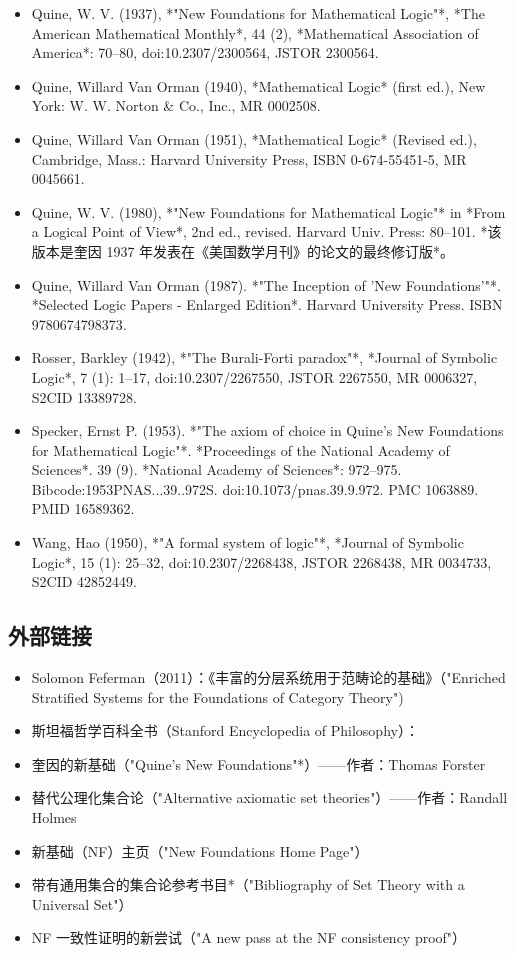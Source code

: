 \begin{itemize}
\item Quine, W. V. (1937), *"New Foundations for Mathematical Logic"*, *The American Mathematical Monthly*, 44 (2), *Mathematical Association of America*: 70–80, doi:10.2307/2300564, JSTOR 2300564.  
\item Quine, Willard Van Orman (1940), *Mathematical Logic* (first ed.), New York: W. W. Norton & Co., Inc., MR 0002508.  
\item Quine, Willard Van Orman (1951), *Mathematical Logic* (Revised ed.), Cambridge, Mass.: Harvard University Press, ISBN 0-674-55451-5, MR 0045661.  
\item Quine, W. V. (1980), *"New Foundations for Mathematical Logic"* in *From a Logical Point of View*, 2nd ed., revised. Harvard Univ. Press: 80–101. *该版本是奎因 1937 年发表在《美国数学月刊》的论文的最终修订版*。  
\item Quine, Willard Van Orman (1987). *"The Inception of 'New Foundations'"*. *Selected Logic Papers - Enlarged Edition*. Harvard University Press. ISBN 9780674798373.  
\item Rosser, Barkley (1942), *"The Burali-Forti paradox"*, *Journal of Symbolic Logic*, 7 (1): 1–17, doi:10.2307/2267550, JSTOR 2267550, MR 0006327, S2CID 13389728.  
\item Specker, Ernst P. (1953). *"The axiom of choice in Quine's New Foundations for Mathematical Logic"*. *Proceedings of the National Academy of Sciences*. 39 (9). *National Academy of Sciences*: 972–975. Bibcode:1953PNAS...39..972S. doi:10.1073/pnas.39.9.972. PMC 1063889. PMID 16589362.  
\item Wang, Hao (1950), *"A formal system of logic"*, *Journal of Symbolic Logic*, 15 (1): 25–32, doi:10.2307/2268438, JSTOR 2268438, MR 0034733, S2CID 42852449.
\end{itemize}
\subsection{外部链接}  
\begin{itemize}
\item Solomon Feferman（2011）：《丰富的分层系统用于范畴论的基础》（"Enriched Stratified Systems for the Foundations of Category Theory")  
\item 斯坦福哲学百科全书（Stanford Encyclopedia of Philosophy）：  
\item 奎因的新基础（"Quine's New Foundations"*）——作者：Thomas Forster  
\item 替代公理化集合论（"Alternative axiomatic set theories"）——作者：Randall Holmes    
\item 新基础（NF）主页（"New Foundations Home Page"）  
\item 带有通用集合的集合论参考书目*（"Bibliography of Set Theory with a Universal Set"）  
\item NF 一致性证明的新尝试（"A new pass at the NF consistency proof"）  
\end{itemize}